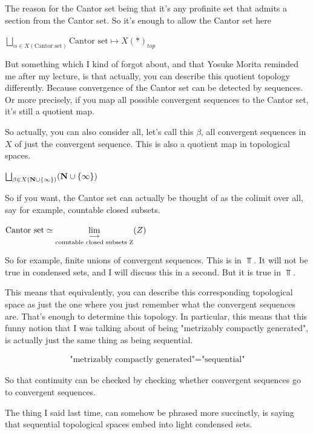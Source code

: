 The reason for the Cantor set being that it's any profinite set that admits a section from the Cantor set. So it's enough to allow the Cantor set here


$\bigsqcup_{\alpha \in X(\text{Cantor set})} \text{Cantor set} \mapsto X(\ast)_{top}$ %

But something which I kind of forgot about, and that Yosuke Morita reminded me after my lecture, is that actually, you can describe this quotient topology differently. Because convergence of the Cantor set can be detected by sequences. Or more precisely, if you map all possible convergent sequences to the Cantor set, it's still a quotient map.

So actually, you can also consider all, let's call this $\beta$, all convergent sequences in $X$ of just the convergent sequence. This is also a quotient map in topological spaces.

$\bigsqcup_{\beta \in X(\mathbf N \cup \{\infty\})} (\mathbf N \cup \{\infty\})$

So if you want, the Cantor set can actually be thought of as the colimit over all, say for example, countable closed subsets. 


$\text{Cantor set} \simeq \mathop{\operatorname*{lim}\limits_{\longrightarrow}}\limits_{\text{countable closed subsets Z}}(Z) $ %

So for example, finite unions of convergent sequences. This is in $\Top$. It will not be true in condensed sets, and I will discuss this in a second. But it is true in $\Top$.

This means that equivalently, you can describe this corresponding topological space as just the one where you just remember what the convergent sequences are. That's enough to determine this topology. 
In particular, this means that this funny notion that I was talking about of being "metrizably compactly generated", is actually just the same thing as being sequential. 

\begin{align*}
\text{"metrizably compactly generated"} = \text{"sequential"} 
\end{align*}

So that continuity can be checked by checking whether convergent sequences go to convergent sequences.


The thing I said last time, can somehow be phrased more succinctly, is saying that sequential topological spaces embed into light condensed sets.

